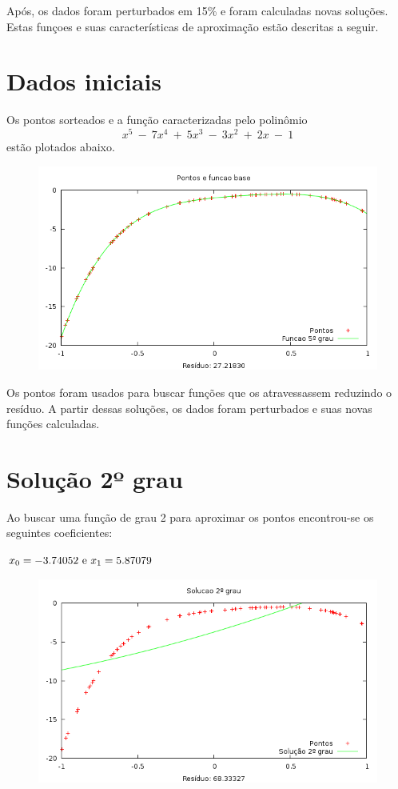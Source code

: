 Após, os dados foram perturbados em 15\% e foram calculadas novas
soluções. Estas funçoes e suas características de aproximação estão descritas 
a seguir.

\section{Dados iniciais}
Os pontos sorteados e a função caracterizadas pelo polinômio \[x^5~-~7x^4~+~5x^3~-~3x^2~+~2x~-~1\]
estão plotados abaixo.

\begin{figure}[h]
\centering
\includegraphics[scale=0.7]{funcbase}
\end{figure}

Os pontos foram usados para buscar funções que os atravessassem reduzindo o resíduo.
A partir dessas soluções, os dados foram perturbados e suas novas funções calculadas.



\newpage
\section{Solução 2º grau}

Ao buscar uma função de grau 2 para aproximar os pontos encontrou-se os seguintes 
coeficientes:

\(x_0 = -3.74052 ~$e$~  x_1 = 5.87079 \)

\begin{figure}[h]
\centering
\includegraphics[scale=0.7]{sol2grau}
\end{figure}


